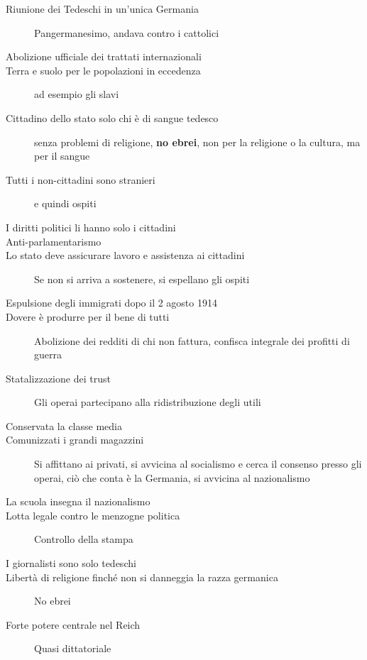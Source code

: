 \begin{description}
  \item[Riunione dei Tedeschi in un'unica Germania] Pangermanesimo, andava contro i cattolici
  \item[Abolizione ufficiale dei trattati internazionali]
  \item[Terra e suolo per le popolazioni in eccedenza] ad esempio gli slavi
  \item[Cittadino dello stato solo chi è di sangue tedesco] senza problemi di religione, 
    \textbf{no ebrei}, non per la religione o la cultura, ma per il sangue
  \item[Tutti i non-cittadini sono stranieri] e quindi ospiti
  \item[I diritti politici li hanno solo i cittadini]
  \item[Anti-parlamentarismo] 
  \item[Lo stato deve assicurare lavoro e assistenza ai cittadini] Se non si arriva a sostenere, si
    espellano gli ospiti
  \item[Espulsione degli immigrati dopo il 2 agosto 1914]
  \item[Dovere è produrre per il bene di tutti] Abolizione dei redditi di chi non fattura, confisca
    integrale dei profitti di guerra
  \item[Statalizzazione dei trust] Gli operai partecipano alla ridistribuzione degli utili
  \item[Conservata la classe media]
  \item[Comunizzati i grandi magazzini] Si affittano ai privati, si avvicina al socialismo e cerca il
    consenso presso gli operai, ciò che conta è la Germania, si avvicina al nazionalismo
  \item[La scuola insegna il nazionalismo]
  \item[Lotta legale contro le menzogne politica] Controllo della stampa
  \item[I giornalisti sono solo tedeschi]
  \item[Libertà di religione finché non si danneggia la razza germanica] No ebrei
  \item[Forte potere centrale nel Reich] Quasi dittatoriale
\end{description}

